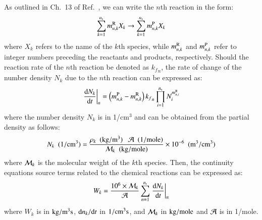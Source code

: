 \documentclass{warpdoc}
\let\citen\cite
\newcommand{\ns}{{{n}_{\rm s}}}
\begin{document}
As outlined in Ch.\ 13 of Ref.\ \citen{book:1989:anderson}, we can write the $n$th reaction in the form:
%
\begin{equation}
  \sum_{k=1}^\ns m_{n,k}^{\rm R} X_k \rightarrow \sum_{k=1}^\ns m_{n,k}^{\rm P} X_k
\end{equation}
%
where $X_k$ refers to the name of the $k$th species, while $m_{n,k}^{\rm R}$ and $m_{n,k}^{\rm P}$
refer to integer numbers preceding the reactants and products, respectively. 
 Should the reaction rate of the $n$th reaction be denoted as ${k_f}_n$,
the rate of change of the number density $N_{k}$ due to the $n$th reaction can be expressed as:
%
\begin{equation}
  \left. \frac{{\rm d} N_{k}}{{\rm d} t} \right|_n = \left( m_{n,k}^{\rm P} - m_{n,k}^{\rm R} \right) {k_f}_n \prod_{i=1}^\ns N_{i}^{m_{n,i}^{\rm R}}
\end{equation}
%
where the number density $N_{k}$ is in  1/cm$^3$ and can be obtained from the partial density as follows:
%
\begin{equation}
  N_{k} {\rm ~~(1/cm^3)}= \frac{\rho_k {\rm ~~(kg/m^3)}~~~{\cal A ~~{\rm (1/mole)}}}{{\cal M}_k {\rm ~~(kg/mole)}} \times 10^{-6} {\rm ~~(m^3/cm^3)}
\end{equation}
%
where ${\cal M}_k$ is the molecular weight of the $k$th species. 
Then, the continuity equations source terms related to the chemical reactions can be expressed as:
%
\begin{equation}
 W_k  = \frac{10^6 \times {\cal M}_k}{\cal A} \sum_{n=1}^{n_{\rm r}} \left. \frac{{\rm d} N_{k}}{{\rm d} t} \right|_n     
\end{equation}
%
where $W_k$ is in $\rm kg/m^3 s$, ${{\rm d} n_k}/{{\rm d} t}$ in $\rm 1/cm^3 s$, and ${\cal M}_k$ in $\rm kg/mole$ and $\cal A$ is in 1/mole.



\end{document}
